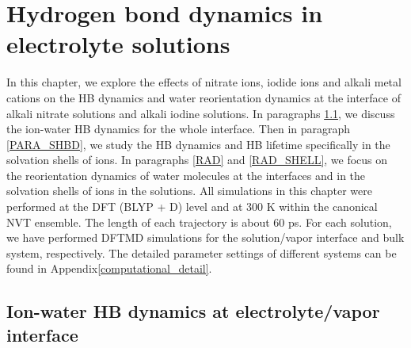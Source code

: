 \chapter{Hydrogen bond dynamics in electrolyte solutions}\label{CHAPTER_HB_SOLUTIONS}
In this chapter, we explore the effects of nitrate ions, iodide ions and alkali metal cations 
on the HB dynamics and water reorientation dynamics at the interface of alkali nitrate solutions and alkali
iodine solutions. %
In paragraphs \ref{HBD_ITP}, we discuss the ion-water HB dynamics for the whole interface. 
Then in paragraph \ref{PARA_SHBD}, we study the HB dynamics and HB lifetime specifically in the solvation shells of ions.
In paragraphs \ref{RAD} and \ref{RAD_SHELL}, we focus on the reorientation dynamics of water molecules at the interfaces
and in the solvation shells of ions in the solutions.
All simulations in this chapter were performed at the DFT (BLYP + D) level and at 300 K within the canonical NVT ensemble.
The length of each trajectory is about 60 ps.
For each solution, we have performed DFTMD simulations for the solution/vapor interface and bulk system, respectively. 
The detailed parameter settings of different systems can be found in Appendix\thinspace\ref{computational_detail}.

\section{Ion-water HB dynamics at electrolyte/vapor interface}\label{HBD_ITP}

